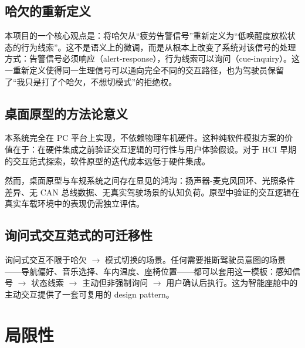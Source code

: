 \documentclass[12pt,a4paper]{ctexart}
\begin{document}
\subsection{哈欠的重新定义}

本项目的一个核心观点是：将哈欠从“疲劳告警信号”重新定义为“低唤醒度放松状态的行为线索”。这不是语义上的微调，而是从根本上改变了系统对该信号的处理方式：告警信号必须响应（alert-response），行为线索可以询问（cue-inquiry）。这一重新定义使得同一生理信号可以通向完全不同的交互路径，也为驾驶员保留了“我只是打了个哈欠，不想切模式”的拒绝权。

\subsection{桌面原型的方法论意义}

本系统完全在 PC 平台上实现，不依赖物理车机硬件。这种纯软件模拟方案的价值在于：在硬件集成之前验证交互逻辑的可行性与用户体验假设。对于 HCI 早期的交互范式探索，软件原型的迭代成本远低于硬件集成。

然而，桌面原型与车规系统之间存在显见的鸿沟：扬声器-麦克风回环、光照条件差异、无 CAN 总线数据、无真实驾驶场景的认知负荷。原型中验证的交互逻辑在真实车载环境中的表现仍需独立评估。

\subsection{询问式交互范式的可迁移性}

询问式交互不限于哈欠 $\rightarrow$ 模式切换的场景。任何需要推断驾驶员意图的场景——导航偏好、音乐选择、车内温度、座椅位置——都可以套用这一模板：感知信号 $\rightarrow$ 状态线索 $\rightarrow$ 主动但非强制询问 $\rightarrow$ 用户确认后执行。这为智能座舱中的主动交互提供了一套可复用的 design pattern。

\section{局限性}
\end{document}
